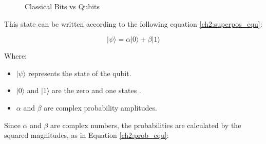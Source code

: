 \documentclass[a4paper]{report}
\begin{document}
{\begin{itemize}
\begin{figure}[ht]

\caption{Classical Bits vs Qubits}
\label{bit vs qubit}
\end{figure}

This state can be written according to the following equation \eqref{ch2:superpos_equ}:

\begin{equation}
    |\psi\rangle = \alpha |0\rangle + \beta |1\rangle
    \label{ch2:superpos_equ}
\end{equation}

\noindent Where:
\begin{itemize}
    \item $|\psi\rangle$ represents the state of the qubit.
    \item $|0\rangle$ and $|1\rangle$ are the zero and one states .
    \item $\alpha$ and $\beta$ are complex probability amplitudes.
\end{itemize}

Since $\alpha$ and $\beta$ are complex numbers, the probabilities are calculated by the squared magnitudes, as in Equation \eqref{ch2:prob_equ}:


\end{itemize}}
\end{document}
